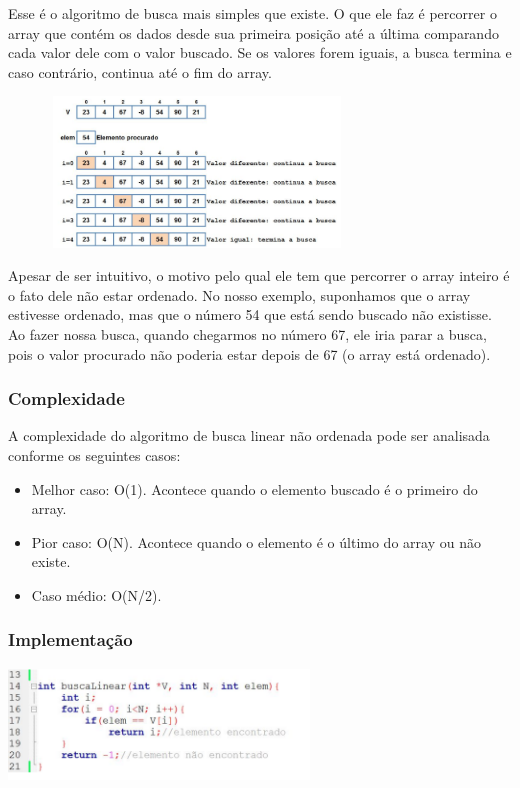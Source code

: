 \documentclass{report}
\begin{document}
	Esse é o algoritmo de busca mais simples que existe. O que ele faz é percorrer o array que contém os dados desde sua primeira posição até a última comparando cada valor dele com o valor buscado. Se os valores forem iguais, a busca termina e caso contrário, continua até o fim do array.
	
	
	\begin{center}
		
		\includegraphics[width=10cm,height=4cm,keepaspectratio=false]{imagens/blinearfuncionamento.png}
		
	\end{center}
	
	Apesar de ser intuitivo, o motivo pelo qual ele tem que percorrer o array inteiro é o fato dele não estar ordenado. No nosso exemplo, suponhamos que o array estivesse ordenado, mas que o número 54 que está sendo buscado não existisse. Ao fazer nossa busca, quando chegarmos no número 67, ele iria parar a busca, pois o valor procurado não poderia estar depois de 67 (o array está ordenado).
	\subsubsection{Complexidade}
	
	A complexidade do algoritmo de busca linear não ordenada pode ser analisada conforme os seguintes casos:
	
	\begin{itemize}
		\item Melhor caso: O(1). Acontece quando o elemento buscado é o primeiro do array.
		\item Pior caso: O(N). Acontece quando o elemento é o último do array ou não existe.
		\item Caso médio: O(N/2). 
	\end{itemize}
	
	\subsubsection{Implementação}
	
	\begin{center}
		
		\includegraphics[width=8cm,height=3cm,keepaspectratio=false]{imagens/blinear.png}
		
	\end{center}
	
\end{document}
